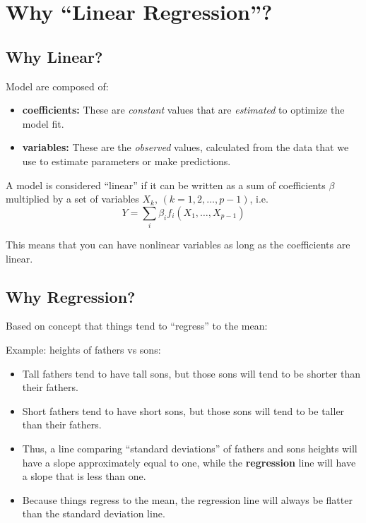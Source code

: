 \documentclass[12pt]{../notes}
\begin{document}
\section{Why ``Linear Regression''?}
\subsection{Why Linear?}
Model are composed of:
\begin{itemize}
\item \textbf{coefficients:} These are \textit{constant} values that are \textit{estimated} to optimize the model fit. 
\item \textbf{variables:} These are the \textit{observed} values, calculated from the data that we use to estimate parameters or make predictions. 
\end{itemize}

A model is considered ``linear'' if it can be written as a sum of coefficients $\beta$ multiplied by a set of variables $X_k, \, (k = 1, 2, \ldots, p-1)$, i.e. 
\[Y = \sum_i\beta_if_i\left(X_1, \ldots, X_{p-1}\right)\]

This means that you can have nonlinear variables as long as the coefficients are linear.



\subsection{Why Regression?}
Based on concept that things tend to ``regress'' to the mean:

Example: heights of fathers vs sons:
\begin{itemize}
\item Tall fathers tend to have tall sons, but those sons will tend to be shorter than their fathers. 
\item Short fathers tend to have short sons, but those sons will tend to be taller than their fathers. 
\item Thus, a line comparing ``standard deviations'' of fathers and sons heights will have a slope approximately equal to one, while the \textbf{regression} line will have a slope that is less than one. 
\item Because things regress to the mean, the regression line will always be flatter than the standard deviation line. 
\end{itemize}
\end{document}
